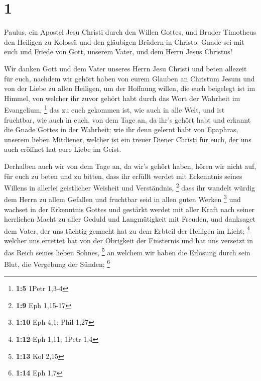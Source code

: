 \hypertarget{section}{%
\section{1}\label{section}}

 Paulus, ein Apostel Jesu Christi durch den Willen Gottes,
und Bruder Timotheus  den Heiligen zu Kolossä und den
gläubigen Brüdern in Christo: Gnade sei mit euch und Friede von Gott,
unserem Vater, und dem Herrn Jesus Christus!

 Wir danken Gott und dem Vater unseres Herrn Jesu Christi
und beten allezeit für euch,  nachdem wir gehört haben von
eurem Glauben an Christum Jesum und von der Liebe zu allen Heiligen,
 um der Hoffnung willen, die euch beigelegt ist im Himmel,
von welcher ihr zuvor gehört habt durch das Wort der Wahrheit im
Evangelium, \footnote{\textbf{1:5} 1Petr 1,3-4}  das zu euch
gekommen ist, wie auch in alle Welt, und ist fruchtbar, wie auch in
euch, von dem Tage an, da ihr's gehört habt und erkannt die Gnade Gottes
in der Wahrheit;  wie ihr denn gelernt habt von Epaphras,
unserem lieben Mitdiener, welcher ist ein treuer Diener Christi für
euch,  der uns auch eröffnet hat eure Liebe im Geist.

 Derhalben auch wir von dem Tage an, da wir's gehört haben,
hören wir nicht auf, für euch zu beten und zu bitten, dass ihr erfüllt
werdet mit Erkenntnis seines Willens in allerlei geistlicher Weisheit
und Verständnis, \footnote{\textbf{1:9} Eph 1,15-17}  dass
ihr wandelt würdig dem Herrn zu allem Gefallen und fruchtbar seid in
allen guten Werken \footnote{\textbf{1:10} Eph 4,1; Phil 1,27}
 und wachset in der Erkenntnis Gottes und gestärkt werdet
mit aller Kraft nach seiner herrlichen Macht zu aller Geduld und
Langmütigkeit mit Freuden,  und danksaget dem Vater, der
uns tüchtig gemacht hat zu dem Erbteil der Heiligen im Licht;
\footnote{\textbf{1:12} Eph 1,11; 1Petr 1,4}  welcher uns
errettet hat von der Obrigkeit der Finsternis und hat uns versetzt in
das Reich seines lieben Sohnes, \footnote{\textbf{1:13} Kol 2,15}
 an welchem wir haben die Erlösung durch sein Blut, die
Vergebung der Sünden; \footnote{\textbf{1:14} Eph 1,7}

